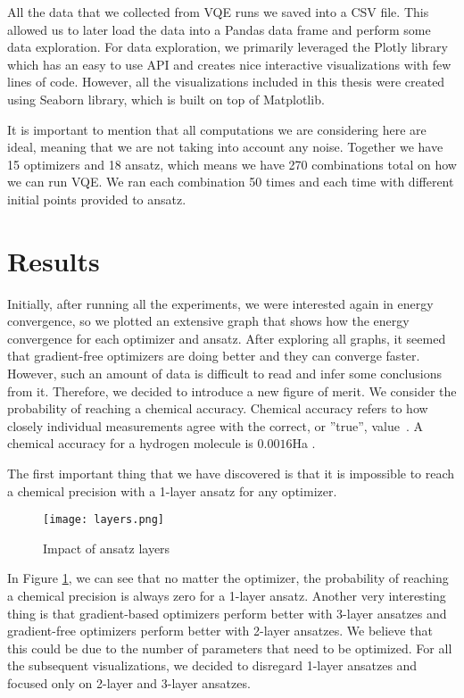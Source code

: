 All the data that we collected from VQE runs we saved into a CSV file. This allowed us to later load the data into a Pandas data frame and perform some data exploration. For data exploration, we primarily leveraged the Plotly library which has an easy to use API and creates nice interactive visualizations with few lines of code. However, all the visualizations included in this thesis were created using Seaborn library, which is built on top of Matplotlib.

It is important to mention that all computations we are considering here are ideal, meaning that we are not taking into account any noise. Together we have 15 optimizers and 18 ansatz, which means we have 270 combinations total on how we can run VQE. We ran each combination 50 times and each time with different initial points provided to ansatz. 

\section{Results} 
Initially, after running all the experiments, we were interested again in energy convergence, so we plotted an extensive graph that shows how the energy convergence for each optimizer and ansatz. After exploring all graphs, it seemed that gradient-free optimizers are doing better and they can converge faster. However, such an amount of data is difficult to read and infer some conclusions from it. Therefore, we decided to introduce a new figure of merit. We consider the probability of reaching a chemical accuracy. Chemical accuracy refers to how closely individual measurements agree with the correct, or ''true'', value~\cite{chemistry}. A chemical accuracy for a hydrogen molecule is $0.0016$Ha . 


The first important thing that we have discovered is that it is impossible to reach a chemical precision with a 1-layer ansatz for any optimizer.
\begin{figure}[H]
    \centering
    \texttt{[image: layers.png]}
    \caption{Impact of ansatz layers}
    \label{fig:ansatz-layers}
\end{figure}

In Figure \ref{fig:ansatz-layers}, we can see that no matter the optimizer, the probability of reaching a chemical precision is always zero for a 1-layer ansatz. Another very interesting thing is that gradient-based optimizers perform better with 3-layer ansatzes and gradient-free optimizers perform better with 2-layer ansatzes. We believe that this could be due to the number of parameters that need to be optimized. For all the subsequent visualizations, we decided to disregard 1-layer ansatzes and focused only on 2-layer and 3-layer ansatzes.

